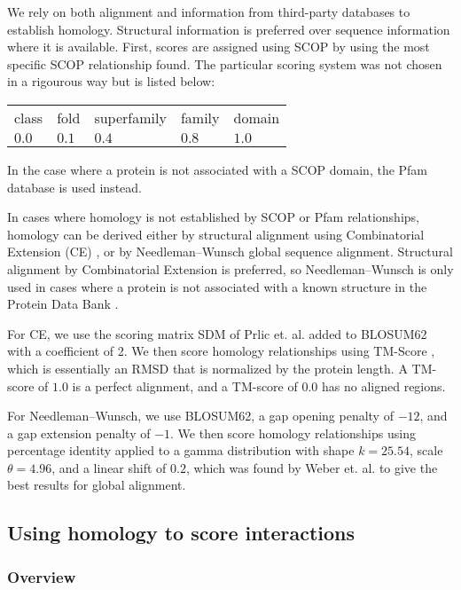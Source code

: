 \documentclass[12pt,twoside]{article}
\begin{document}
We rely on both alignment and information from third-party databases to establish homology. Structural information is preferred over sequence information where it is available. First, scores are assigned using SCOP by using the most specific SCOP relationship found. The particular scoring system was not chosen in a rigourous way but is listed below:

\begin{tabular}{lllll}
class & fold & superfamily & family & domain \\
$0.0$ & $0.1$ & $0.4$ & $0.8$ & $1.0$ \\
\end{tabular}

In the case where a protein is not associated with a SCOP domain, the Pfam database is used instead.

In cases where homology is not established by SCOP \cite{scop} or Pfam relationships, homology can be derived either by structural alignment using Combinatorial Extension (CE) \cite{ce}, or by Needleman--Wunsch \cite{needleman} global sequence alignment. Structural alignment by Combinatorial Extension is preferred, so Needleman--Wunsch is only used in cases where a protein is not associated with a known structure in the Protein Data Bank \cite{pdb}.

For CE, we use the scoring matrix SDM of Prlic et. al. \cite{prlic} added to BLOSUM62 \cite{blosum} with a coefficient of 2. We then score homology relationships using TM-Score \cite{zhang}, which is essentially an RMSD that is normalized by the protein length. A TM-score of $1.0$ is a perfect alignment, and a TM-score of $0.0$ has no aligned regions.

For Needleman--Wunsch, we use BLOSUM62, a gap opening penalty of $-12$, and a gap extension penalty of $-1$. We then score homology relationships using percentage identity applied to a gamma distribution with shape $k=25.54$, scale $\theta=4.96$, and a linear shift of $0.2$, which was found by Weber et. al. \cite{webber} to give the best results for global alignment.

\subsection{Using homology to score interactions}

\subsubsection{Overview}
\end{document}
